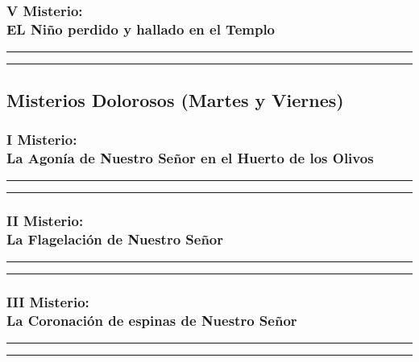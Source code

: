\documentclass[11pt,a4paper]{report}
\begin{document}
    \subsubsection*{V Misterio:\\ EL Niño perdido y hallado en el Templo}
    
    
    \rule{\textwidth}{0.5pt}
    
    \rule{\textwidth}{0.5pt}
    

    

    \subsection*{Misterios Dolorosos (Martes y Viernes)}

    \subsubsection*{I Misterio:\\ La Agonía de Nuestro Señor en el Huerto de los Olivos}
    
    
    \rule{\textwidth}{0.5pt}
    
    \rule{\textwidth}{0.5pt}
    

    \subsubsection*{II Misterio:\\ La Flagelación de Nuestro Señor}
    
    
    \rule{\textwidth}{0.5pt}
    
    \rule{\textwidth}{0.5pt}
    

    \subsubsection*{III Misterio:\\ La Coronación de espinas de Nuestro Señor}
    
    
    \rule{\textwidth}{0.5pt}
    
    \rule{\textwidth}{0.5pt}
    
\end{document}
